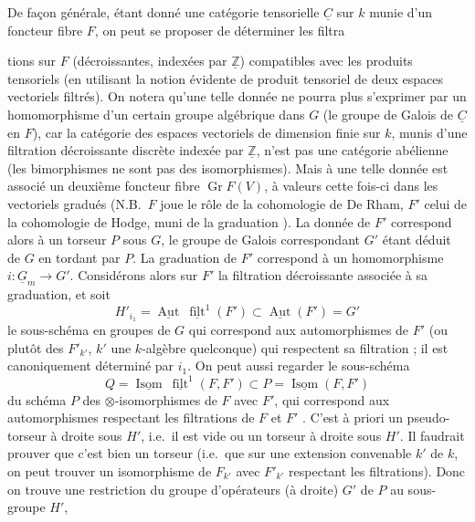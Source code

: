 \documentclass[11pt,a4paper]{article}
\begin{document}
De façon générale, étant donné une catégorie tensorielle $\underline{C}$ sur
$k$ munie d'un foncteur fibre $F$, on peut se proposer de déterminer les
filtra\-

tions sur $F$ (décroissantes,  indexées par
$\underline{\mathbb{Z}}$) compatibles avec les produits tensoriels (en
utilisant la notion évidente de produit tensoriel de deux espaces vectoriels
filtrés). On notera qu'une telle donnée ne pourra plus s'exprimer par un
homomorphisme d'un certain groupe algébrique dans $G$ (le groupe de Galois de
$\underline{C}$ en $F$), car la catégorie des espaces vectoriels de dimension
finie sur $k$, munis d'une filtration décroissante discrète indexée par
$\underline{\mathbb{Z}}$, n'est pas une catégorie abélienne (les bimorphismes
ne sont pas des isomorphismes). Mais à une telle donnée est associé un
deuxième foncteur fibre  $\operatorname{Gr} F(V)$, à valeurs
cette fois-ci dans les vectoriels gradués (N.B.\ $F$ joue le rôle de la
cohomologie de  De Rham, $F'$ celui de la cohomologie de Hodge,
muni de la graduation  ). La donnée de $F'$
correspond alors à un torseur  $P$ sous $G$, le groupe de
Galois correspondant $G'$ étant déduit de $G$ en tordant par $P$. La
graduation de $F'$ correspond à un homomorphisme
$i : \underline{G}_{m} \to G'$. Considé\-rons alors sur $F'$ la filtration
décroissante associée à sa graduation, et soit
\[
H'_{i_{1}} = \underline{\operatorname{Aut}}\ \underline{\operatorname{filt}}^{1}(F')
\subset \underline{\operatorname{Aut}}(F') = G'
\]
le sous-schéma en groupes de $G$ qui correspond aux \add{$\otimes$-}auto\-mor\-phismes
de $F'$ (ou plutôt des $F'_{k'}$, $k'$ une $k$-algèbre quelconque) qui
respectent sa filtration  ; il est canoniquement déterminé par $i_{1}$. On peut aussi regarder
le sous-schéma
\[
Q = \underline{\operatorname{Isom}}\ \underline{\operatorname{filt}}^{1}(F,F')
\subset P = \underline{\operatorname{Isom}}(F,F')
\]
du schéma $P$ des $\otimes$-isomorphismes de $F$ avec $F'$, 
qui correspond aux automorphismes respectant les filtrations de $F$ et $F'$
. C'est à priori un
pseudo-torseur à droite sous $H'$, i.e.\ il est vide ou un torseur à droite
sous $H'$.
Il faudrait prouver que c'est bien un torseur (i.e.\ que sur une extension
convenable $k'$ de $k$, on peut trouver un isomorphisme de $F_{k'}$ avec
$F'_{k'}$ respectant les filtrations). Donc on trouve une restriction du
groupe d'opérateurs (à droite) $G'$ de $P$ au sous-groupe $H'$,
\end{document}
